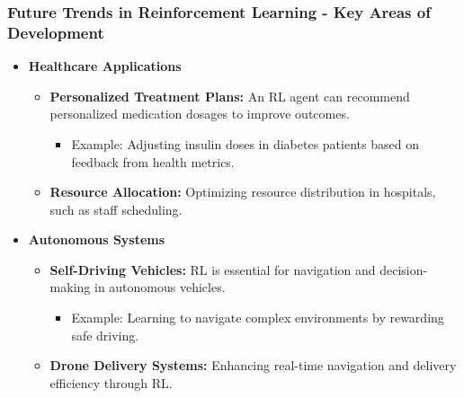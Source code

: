 \documentclass[aspectratio=169]{beamer}
\begin{document}
\begin{frame}[fragile]
    \frametitle{Future Trends in Reinforcement Learning - Key Areas of Development}
    \begin{itemize}
        \item \textbf{Healthcare Applications}
        \begin{itemize}
            \item \textbf{Personalized Treatment Plans:} 
            An RL agent can recommend personalized medication dosages to improve outcomes.
            \begin{itemize}
                \item Example: Adjusting insulin doses in diabetes patients based on feedback from health metrics.
            \end{itemize}
            \item \textbf{Resource Allocation:} 
            Optimizing resource distribution in hospitals, such as staff scheduling.
        \end{itemize}
        \item \textbf{Autonomous Systems}
        \begin{itemize}
            \item \textbf{Self-Driving Vehicles:} 
            RL is essential for navigation and decision-making in autonomous vehicles.
            \begin{itemize}
                \item Example: Learning to navigate complex environments by rewarding safe driving.
            \end{itemize}
            \item \textbf{Drone Delivery Systems:} 
            Enhancing real-time navigation and delivery efficiency through RL.
        \end{itemize}
    \end{itemize}
\end{frame}
\end{document}

